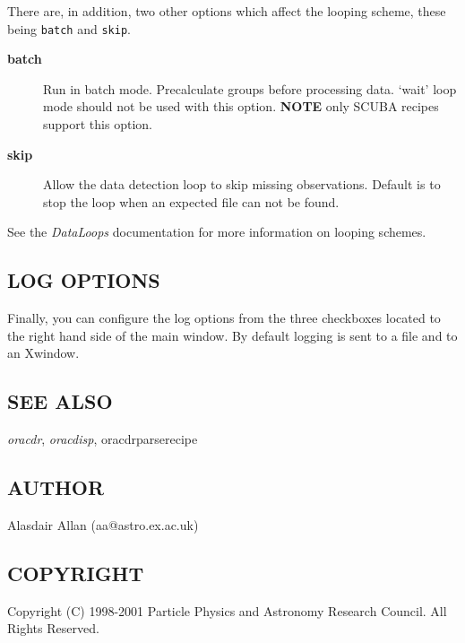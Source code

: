 \documentclass[twoside,11pt]{article}
\renewcommand{\_}{\texttt{\symbol{95}}}
\begin{document}
There are, in addition, two other options which affect the looping
scheme, these being \texttt{batch} and \texttt{skip}.

\begin{description}

\item[\textbf{batch}] \mbox{}

Run in batch mode. Precalculate groups before processing data. `wait'
loop mode should not be used with this option.  \textbf{NOTE} only SCUBA
recipes support this option.


\item[\textbf{skip}] \mbox{}

Allow the data detection loop to skip missing observations. Default is
to stop the loop when an expected file can not be found.

\end{description}


See the \emph{DataLoops} documentation for more information on looping
schemes.

\subsection*{LOG OPTIONS\label{Xoracdr_LOG_OPTIONS}}


Finally, you can configure the log options from the three checkboxes
located to the right hand side of the main window. By default logging
is sent to a file and to an Xwindow.

\subsection*{SEE ALSO\label{Xoracdr_SEE_ALSO}}


\emph{oracdr}, \emph{oracdisp}, \textsf{oracdr\_parse\_recipe}

\subsection*{AUTHOR\label{Xoracdr_AUTHOR}}


Alasdair Allan (aa@astro.ex.ac.uk)

\subsection*{COPYRIGHT\label{Xoracdr_COPYRIGHT}}


Copyright (C) 1998-2001 Particle Physics and Astronomy Research Council.
All Rights Reserved.
\end{document}
